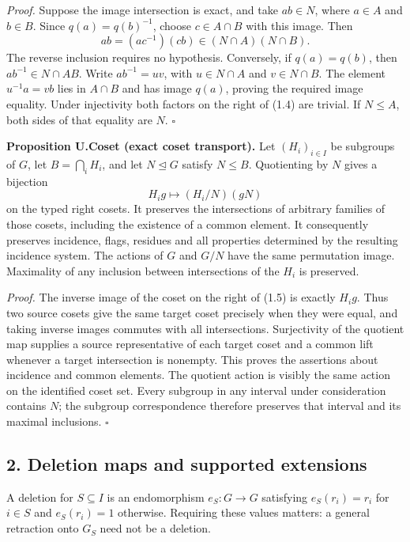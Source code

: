 \documentclass[
  11pt,
  a4paper,
]{article}
\begin{document}
\emph{Proof.} Suppose the image intersection is exact, and take
\(ab\in N\), where \(a\in A\) and \(b\in B\). Since \(q(a)=q(b)^{-1}\),
choose \(c\in A\cap B\) with this image. Then \[
ab=(ac^{-1})(cb)\in(N\cap A)(N\cap B).
\] The reverse inclusion requires no hypothesis. Conversely, if
\(q(a)=q(b)\), then \(ab^{-1}\in N\cap AB\). Write \(ab^{-1}=uv\), with
\(u\in N\cap A\) and \(v\in N\cap B\). The element \(u^{-1}a=vb\) lies
in \(A\cap B\) and has image \(q(a)\), proving the required image
equality. Under injectivity both factors on the right of (1.4) are
trivial. If \(N\leq A\), both sides of that equality are \(N\).
\(\square\)

\textbf{Proposition U.Coset (exact coset transport).} Let
\((H_i)_{i\in I}\) be subgroups of \(G\), let \(B=\bigcap_i H_i\), and
let \(N\unlhd G\) satisfy \(N\leq B\). Quotienting by \(N\) gives a
bijection \[
H_i g\longmapsto (H_i/N)(gN)
\tag{1.5}
\] on the typed right cosets. It preserves the intersections of
arbitrary families of those cosets, including the existence of a common
element. It consequently preserves incidence, flags, residues and all
properties determined by the resulting incidence system. The actions of
\(G\) and \(G/N\) have the same permutation image. Maximality of any
inclusion between intersections of the \(H_i\) is preserved.

\emph{Proof.} The inverse image of the coset on the right of (1.5) is
exactly \(H_i g\). Thus two source cosets give the same target coset
precisely when they were equal, and taking inverse images commutes with
all intersections. Surjectivity of the quotient map supplies a source
representative of each target coset and a common lift whenever a target
intersection is nonempty. This proves the assertions about incidence and
common elements. The quotient action is visibly the same action on the
identified coset set. Every subgroup in any interval under consideration
contains \(N\); the subgroup correspondence therefore preserves that
interval and its maximal inclusions. \(\square\)

\subsection{2. Deletion maps and supported
extensions}\label{deletion-maps-and-supported-extensions}

A deletion for \(S\subseteq I\) is an endomorphism \(e_S:G\to G\)
satisfying \(e_S(r_i)=r_i\) for \(i\in S\) and \(e_S(r_i)=1\) otherwise.
Requiring these values matters: a general retraction onto \(G_S\) need
not be a deletion.
\end{document}
